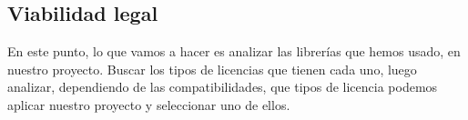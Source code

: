 \begin{table}[]
\centering
\caption{Tabla de los costes totales}
\label{tab:costes}
\end{table}

\subsection{Viabilidad legal}
En este punto, lo que vamos a hacer es analizar las librerías que hemos usado, en nuestro proyecto. Buscar los tipos de licencias que tienen cada uno, luego analizar, dependiendo de las compatibilidades, que tipos de licencia podemos aplicar nuestro proyecto y seleccionar uno de ellos.

